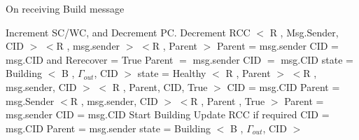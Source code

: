 	
\begin{algorithm}[H]
\caption{On receiving Build message}
\label{Build message received}
\scriptsize
\begin{multicols}{2}
\begin{algorithmic}[1]
\State Increment SC/WC, and Decrement PC.
    \State Decrement RCC
  \EndIf
{}
	\State $<$ R , Msg.Sender, CID $>$
		\State $<$R , msg.sender $>$
	\Else
			\State $<$R , Parent $>$
		\EndIf
		\State Parent = msg.sender
		\State CID = msg.CID and Rerecover = True
	\EndIf
{}
	\State Parent $=$ msg.sender
	\State CID $=$ msg.CID
		\State state = Building
		\State $<$ B , $\Gamma_{out}$, CID $>$
	\Else
		\State state = Healthy
		\State $<$ R , Parent $>$
	\EndIf
{}
		\State $<$R , msg.sender, CID $>$
	\Else
			\State $<$ R , Parent, CID, True $>$
		\EndIf
		\State CID = msg.CID
		\State Parent = msg.Sender
	\EndIf
{}
		\State $<$R , msg.sender, CID $>$
	\Else
			\State $<$R , Parent , True $>$
		\EndIf
		\State Parent = msg.sender
		\State CID = msg.CID
	\EndIf
  \State Start Building
	\State Update RCC if required
	\State CID = msg.CID
	\State Parent = msg.sender
	\State state = Building
	\State $<$ B , $\Gamma_{out}$, CID $>$
\EndIf
\EndProcedure
\end{algorithmic}
\end{multicols}
\end{algorithm}	


